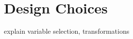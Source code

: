 \documentclass[12pt]{article}
\begin{document}


\section{Design Choices} %
\label{sec:design_choices}

explain variable selection, transformations

\end{document}
